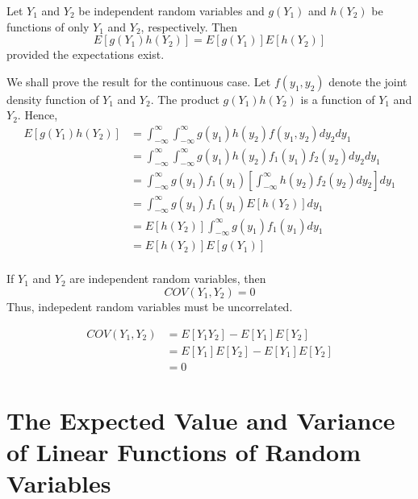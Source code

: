 \documentclass[12pt, a4paper, twoside, openright, titlepage]{book}
\begin{document}
\begin{thm}{}{}
    Let $Y_1$ and $Y_2$ be independent random variables and $g(Y_1)$ and $h(Y_2)$ be functions of only $Y_1$ and $Y_2$, respectively. Then \begin{equation*}
        E[g(Y_1)h(Y_2)] = E[g(Y_1)]E[h(Y_2)]
    \end{equation*}
    provided the expectations exist.
\end{thm}
\begin{proof*}{}{}
    We shall prove the result for the continuous case. Let $f(y_1,y_2)$ denote the joint density function of $Y_1$ and $Y_2$. The product $g(Y_1)h(Y_2)$ is a function of $Y_1$ and $Y_2$. Hence, \begin{align*}
        E[g(Y_1)h(Y_2)] &= \int_{-\infty}^{\infty}\int_{-\infty}^{\infty}g(y_1)h(y_2)f(y_1,y_2)dy_2dy_1 \\
        &= \int_{-\infty}^{\infty}\int_{-\infty}^{\infty}g(y_1)h(y_2)f_1(y_1)f_2(y_2)dy_2dy_1 \\
        &= \int_{-\infty}^{\infty}g(y_1)f_1(y_1)\left[\int_{-\infty}^{\infty}h(y_2)f_2(y_2)dy_2\right]dy_1 \\
        &= \int_{-\infty}^{\infty}g(y_1)f_1(y_1)E[h(Y_2)]dy_1 \\
        &= E[h(Y_2)]\int_{-\infty}^{\infty}g(y_1)f_1(y_1)dy_1 \\
        &= E[h(Y_2)]E[g(Y_1)] \\
    \end{align*}
\end{proof*}


\begin{thm}{}{}
    If $Y_1$ and $Y_2$ are independent random variables, then \begin{equation*}
        COV(Y_1,Y_2) = 0
    \end{equation*}
    Thus, indepedent random variables must be uncorrelated.
\end{thm}
\begin{proof*}{}{}
    \begin{align*}
        COV(Y_1,Y_2) &= E[Y_1Y_2] - E[Y_1]E[Y_2] \\
        &= E[Y_1]E[Y_2] -E[Y_1]E[Y_2] \\
        &= 0
    \end{align*}
\end{proof*}


\section{\textsection The Expected Value and Variance of Linear Functions of Random Variables}
\end{document}
